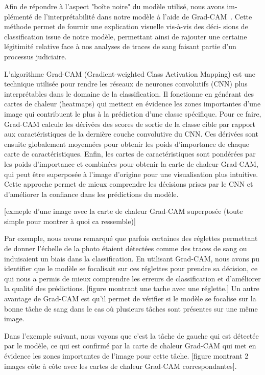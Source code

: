 Afin de répondre à l'aspect "boîte noire" du modèle utilisé, nous avons im-
plémenté de l'interprétabilité dans notre modèle à l'aide de Grad-CAM~\cite{GRADCAM}.
Cette méthode permet de fournir une explication visuelle vis-à-vis des déci-
sions de classification issue de notre modèle, permettant ainsi de rajouter une
certaine légitimité relative face à nos analyses de traces de sang faisant partie
d'un processus judiciaire. 

L'algorithme Grad-CAM (Gradient-weighted Class Activation Mapping) est une technique utilisée pour rendre les réseaux de neurones convolutifs (CNN) plus interprétables dans le domaine de la classification.
Il fonctionne en générant des cartes de chaleur (heatmaps) qui mettent en évidence les zones importantes d'une image qui contribuent le plus à la prédiction d'une classe spécifique.
Pour ce faire, Grad-CAM calcule les dérivées des scores de sortie de la classe cible par rapport aux caractéristiques de la dernière couche convolutive du CNN.
Ces dérivées sont ensuite globalement moyennées pour obtenir les poids d'importance de chaque carte de caractéristiques.
Enfin, les cartes de caractéristiques sont pondérées par les poids d'importance et combinées pour obtenir la carte de chaleur Grad-CAM, qui peut être superposée à l'image d'origine pour une visualisation plus intuitive.
Cette approche permet de mieux comprendre les décisions prises par le CNN et d'améliorer la confiance dans les prédictions du modèle.

[exmeple d'une image avec la carte de chaleur Grad-CAM superposée (toute simple pour montrer à quoi ca ressemble)]

Par exemple, nous avons remarqué que parfois certaines des réglettes permettant de donner l'échelle de la photo étaient détectées comme des traces de sang ou induisaient un biais dans la classification.
En utilisant Grad-CAM, nous avons pu identifier que le modèle se focalisait sur ces réglettes pour prendre sa décision, ce qui nous a permis de mieux comprendre
les erreurs de classification et d'améliorer la qualité des prédictions.
[figure montrant une tache avec une réglette.]
Un autre avantage de Grad-CAM est qu'il permet de vérifier si le modèle se focalise sur la bonne tâche de sang
dans le cas où plusieurs tâches sont présentes sur une même image.

Dans l'exemple suivant, nous voyons que c'est la tâche de gauche qui est détectée par le modèle, ce qui est confirmé par la carte de chaleur Grad-CAM qui met en évidence les zones importantes de l'image pour cette tâche.
[figure montrant 2 images côte à côte avec les cartes de chaleur Grad-CAM correspondantes].
